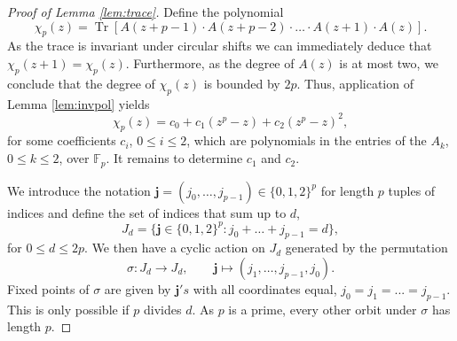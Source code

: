 \documentclass[10pt,a4paper]{amsart}
\begin{document}
\begin{proof}[Proof of Lemma \ref{lem:trace}]
Define the polynomial
\[ \chi_p(z) = \operatorname{Tr}\left[A(z+p-1)\cdot A(z+p-2)\cdot\ldots\cdot A(z+1)\cdot A(z)\right] .\]
As the trace is invariant under circular shifts we can immediately deduce that $\chi_p(z+1) = \chi_p(z)$. Furthermore, as the degree of $A(z)$ is at most two, we conclude that the degree of $\chi_p(z)$ is bounded by $2p$. Thus, application of Lemma \ref{lem:invpol} yields
\begin{equation*}
    \chi_p(z)=c_0+c_1 (z^p-z)+c_2(z^p-z)^2,
\end{equation*}
for some coefficients $c_i$, $0\leq i\leq 2$, which are polynomials in the entries of the $A_k$, $0\leq k\leq 2$, over $\mathbb{F}_p$. It remains to determine $c_1$ and $c_2$.

We introduce the notation $\mathbf{j}=(j_0,\ldots,j_{p-1})\in \{0,1,2\}^p$ for length $p$ tuples of indices and define the set of indices that sum up to $d$,
  \begin{equation*}
      J_d=\{\mathbf{j}\in \{0,1,2\}^p:j_0+\ldots+j_{p-1}=d\},
  \end{equation*}
for $0\leq d\leq 2p$. We then have a cyclic action on $J_d$ generated by the permutation
\begin{equation*}
    \sigma: J_d\rightarrow J_d, \qquad \mathbf{j}\mapsto (j_1,\ldots,j_{p-1},j_0).
\end{equation*}
Fixed points of $\sigma$ are given by $\mathbf{j}'s$ with all coordinates equal,  $j_0=j_1=...=j_{p-1}$. This is only possible if $p$ divides $d$. As $p$ is a prime, every other orbit under $\sigma$ has length $p$.


\end{proof}
\end{document}
